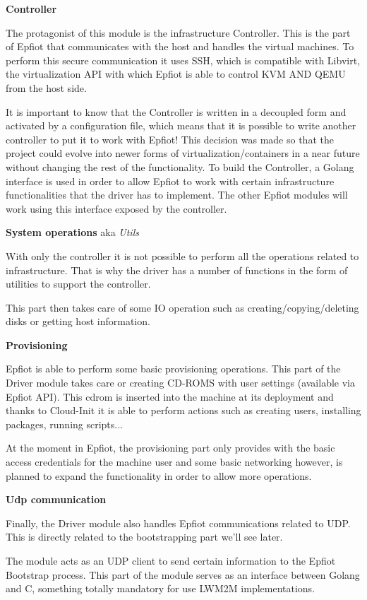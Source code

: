 \textbf{Controller}

The protagonist of this module is the infrastructure Controller. This is the part of Epfiot that communicates with the host and handles the virtual machines. To perform this secure communication it uses SSH, which is compatible with Libvirt, the virtualization API with which Epfiot is able to control KVM AND QEMU from the host side.

It is important to know that the Controller is written in a decoupled form and activated by a configuration file, which means that it is possible to write another controller to put it to work with Epfiot!
This decision was made so that the project could evolve into newer forms of virtualization/containers in a near future without changing the rest of the functionality.
To build the Controller, a Golang interface is used in order to allow Epfiot to work with certain infrastructure functionalities that the driver has to implement.
The other Epfiot modules will work using this interface exposed by the controller.

\textbf{System operations} aka \textit{Utils}

With only the controller it is not possible to perform all the operations related to infrastructure. That is why the driver has a number of functions in the form of utilities to support the controller.

This part then takes care of some IO operation such as creating/copying/deleting disks or getting host information.

\textbf{Provisioning}

Epfiot is able to perform some basic provisioning operations. This part of the Driver module takes care or creating CD-ROMS with user settings (available via Epfiot API). This cdrom is inserted into the machine at its deployment and thanks to Cloud-Init it is able to perform actions such as creating users, installing packages, running scripts...

At the moment in Epfiot, the provisioning part only provides with the basic access credentials for the machine user and some basic networking however, is planned to expand the functionality in order to allow more operations.

\textbf{Udp communication}

Finally, the Driver module also handles Epfiot communications related to UDP. This is directly related to the bootstrapping part we'll see later.

The module acts as an UDP client to send certain information to the Epfiot Bootstrap process. This part of the module serves as an interface between Golang and C, something totally mandatory for use LWM2M implementations.

